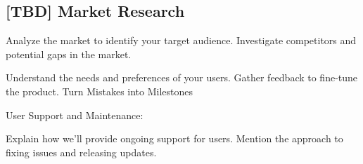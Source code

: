 
\subsection{[TBD] Market Research}

Analyze the market to identify your target audience.
Investigate competitors and potential gaps in the market.

Understand the needs and preferences of your users.
Gather feedback to fine-tune the product. Turn Mistakes into Milestones

User Support and Maintenance:

    Explain how we'll provide ongoing support for users.
    Mention the approach to fixing issues and releasing updates.